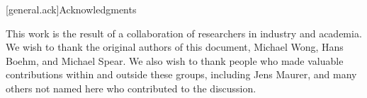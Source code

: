 [general.ack]{Acknowledgments}

This work is the result of a collaboration of researchers in industry and academia. We wish to thank the
original authors of this document, Michael Wong, Hans Boehm, and Michael Spear. We also wish to thank people
who made valuable contributions within and outside these groups, including Jens Maurer, and many others not named
here who contributed to the discussion.




